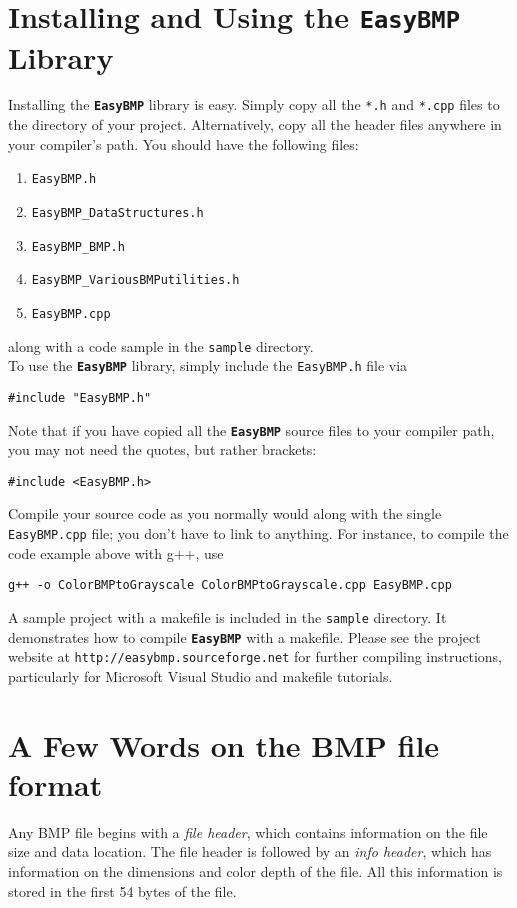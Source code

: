 \documentclass[12pt]{article}
\newcommand{\EasyBMP}{\textbf{\texttt{{\color{DarkBlue}Easy}{\color{DarkRed}BMP}}}}
\begin{document}
\section{Installing and Using the \EasyBMP{} Library}
Installing the \EasyBMP{} library is easy.  Simply copy all the 
\texttt{*.h} and \texttt{*.cpp} files to the directory of your project.  
Alternatively, copy all the header files anywhere in your compiler's path. You 
should have the following files: 
\begin{enumerate}
\item \texttt{EasyBMP.h}
\item \texttt{EasyBMP\_DataStructures.h}
\item \texttt{EasyBMP\_BMP.h}
\item \texttt{EasyBMP\_VariousBMPutilities.h}
\item \texttt{EasyBMP.cpp}
\end{enumerate}
along with a code sample in the \texttt{sample} directory. \\

To use the \EasyBMP{} library, simply include the 
\texttt{EasyBMP.h} file via 
\begin{center}
\texttt{\#include "EasyBMP.h"}
\end{center}
Note that if you have copied all the \EasyBMP{} source files 
to your compiler path, you may not need the quotes, but 
rather brackets: 
\begin{center}
\texttt{\#include <EasyBMP.h>}
\end{center}
Compile your source code as you normally would along with the single 
\texttt{EasyBMP.cpp} file; you don't have to 
link to anything. For instance, to compile the code example above with 
g++, use 
\begin{center}
\texttt{g++ -o ColorBMPtoGrayscale ColorBMPtoGrayscale.cpp EasyBMP.cpp}
\end{center}

A sample project with a makefile is included in the 
\texttt{sample} directory. It demonstrates how to compile 
\EasyBMP{} with a makefile. Please see the project website at 
\texttt{http://easybmp.sourceforge.net} for further compiling 
instructions, particularly for Microsoft Visual Studio and 
makefile tutorials. 

\section{A Few Words on the BMP file format}
Any BMP file begins with a \emph{file header}, which contains 
information on the file size and data location. The 
file header is  followed by an \emph{info header}, which has information on the 
dimensions and color depth of the file. All this information is 
stored in the first 54 bytes of the file. \\
\end{document}
